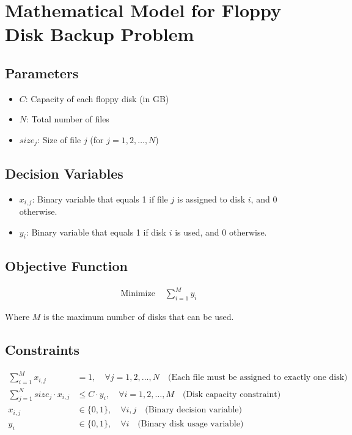 \documentclass{article}
\begin{document}
\section*{Mathematical Model for Floppy Disk Backup Problem}

\subsection*{Parameters}
\begin{itemize}
    \item \( C \): Capacity of each floppy disk (in GB)
    \item \( N \): Total number of files
    \item \( size_j \): Size of file \( j \) (for \( j = 1, 2, \ldots, N \))
\end{itemize}

\subsection*{Decision Variables}
\begin{itemize}
    \item \( x_{i,j} \): Binary variable that equals 1 if file \( j \) is assigned to disk \( i \), and 0 otherwise.
    \item \( y_i \): Binary variable that equals 1 if disk \( i \) is used, and 0 otherwise.
\end{itemize}

\subsection*{Objective Function}
\begin{align*}
    \text{Minimize } & \sum_{i=1}^{M} y_i
\end{align*}

Where \( M \) is the maximum number of disks that can be used.

\subsection*{Constraints}
\begin{align*}
    \sum_{i=1}^{M} x_{i,j} & = 1, \quad \forall j = 1, 2, \ldots, N \quad \text{(Each file must be assigned to exactly one disk)}\\
    \sum_{j=1}^{N} size_j \cdot x_{i,j} & \leq C \cdot y_i, \quad \forall i = 1, 2, \ldots, M \quad \text{(Disk capacity constraint)}\\
    x_{i,j} & \in \{0, 1\}, \quad \forall i, j \quad \text{(Binary decision variable)}\\
    y_i & \in \{0, 1\}, \quad \forall i \quad \text{(Binary disk usage variable)}
\end{align*}
\end{document}

